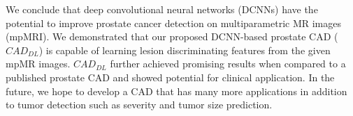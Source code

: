 We conclude that deep convolutional neural networks (DCNNs) have the potential to improve prostate cancer detection on multiparametric MR images (mpMRI). We demonstrated that our proposed DCNN-based prostate CAD ($CAD_{DL}$) is capable of learning lesion discriminating features from the given mpMR images. $CAD_{DL}$ further achieved promising results when compared to a published prostate CAD and showed potential for clinical application. In the future, we hope to develop a CAD that has many more applications in addition to tumor detection such as severity and tumor size prediction. 
